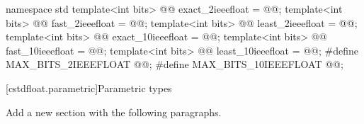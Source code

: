 \begin{addedblock}
    \begin{codeblock}
namespace std {
  template<int bits> @@ exact_2ieeefloat = @\impdefx{}@;
  template<int bits> @@ fast_2ieeefloat = @\impdefx{}@;
  template<int bits> @@ least_2ieeefloat = @\impdefx{}@;
  template<int bits> @@ exact_10ieeefloat = @\impdefx{}@;
  template<int bits> @@ fast_10ieeefloat = @\impdefx{}@;
  template<int bits> @@ least_10ieeefloat = @\impdefx{}@;
}
#define MAX_BITS_2IEEEFLOAT @\impdefx{}@;
#define MAX_BITS_10IEEEFLOAT @\impdefx{}@;
    \end{codeblock}    
\end{addedblock}

[cstdfloat.parametric]{Parametric types}

Add a new section with the following paragraphs.

